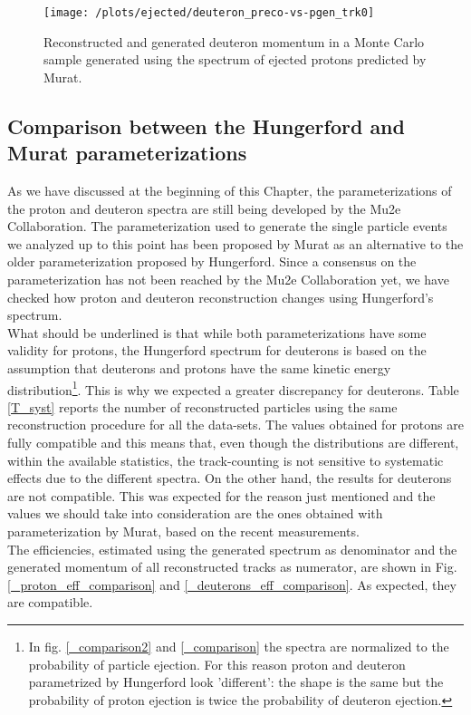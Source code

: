 \documentclass[12pt,a4paper,openright, oneside, titlepage]{book} %
\begin{document}
\begin{figure}[!htb]
\centering
\texttt{[image: /plots/ejected/deuteron\_preco-vs-pgen\_trk0]}
\caption[Deuteron reconstructed vs generated momentum]
{Reconstructed and generated deuteron momentum in a Monte Carlo sample generated using the spectrum of ejected protons predicted by Murat.}
\label{_deuteron_preco-vs-pgen_trk0}
\end{figure}

\subsection{Comparison between the Hungerford and Murat parameterizations}
As we have discussed at the beginning of this Chapter, 
the parameterizations of the proton and deuteron spectra are still being developed
by the Mu2e Collaboration. 
The parameterization used to generate the single particle events 
we analyzed up to this point has been proposed by Murat 
as an alternative to the older parameterization proposed by Hungerford. 
Since a consensus on the parameterization
has not been reached by the Mu2e Collaboration yet, 
we have checked how proton and deuteron reconstruction changes using Hungerford's spectrum.\\
What should be underlined is that while both parameterizations have some validity for protons, 
the Hungerford spectrum for deuterons is based on the assumption that 
deuterons and protons have the same kinetic energy distribution\footnote{In fig. \ref{_comparison2} and \ref{_comparison} the spectra are normalized to the probability of particle ejection. For this reason proton and deuteron parametrized by Hungerford look 'different': the shape is the same but the probability of proton ejection is twice the probability of deuteron ejection.}. 
This is why we expected a greater discrepancy for deuterons. 
Table \ref{T_syst} reports the number of reconstructed particles 
using the same reconstruction procedure for all the data-sets. 
The values obtained for protons are fully compatible and this means that, 
even though the distributions are different, 
within the available statistics, 
the track-counting is not sensitive to systematic effects due 
to the different spectra.
On the other hand, the results for deuterons are not compatible. 
This was expected for the reason just mentioned 
and the values we should take into consideration are the ones
obtained with parameterization by Murat, based on the recent measurements.\\
The efficiencies, estimated using the generated spectrum as denominator
and the generated momentum of all reconstructed tracks as numerator, 
are shown in Fig. \ref{_proton_eff_comparison} and \ref{_deuterons_eff_comparison}. 
As expected, they are compatible.
\end{document}
